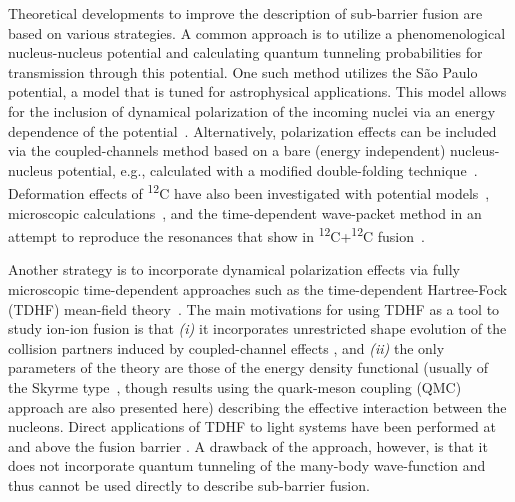 Theoretical developments to improve the description of sub-barrier fusion are based on various strategies.
A common approach is to utilize a phenomenological nucleus-nucleus potential and calculating quantum tunneling probabilities for transmission through this potential.
One such method utilizes the S\~ao Paulo potential, a model that is tuned for astrophysical applications. 
This model allows for the inclusion of dynamical polarization of the incoming nuclei via an energy dependence of the potential~\protect\cite{gasques2004,gasques2005,gasques2007}.
Alternatively, polarization effects can be included via the coupled-channels method based on a bare (energy independent) nucleus-nucleus potential, 
e.g., calculated with a modified double-folding technique~\protect\cite{esbensen2011,jiang2013}.
Deformation effects of \textsuperscript{12}C have also been investigated with potential models~\protect\cite{denisov2010c}, microscopic calculations~\protect\cite{heenen1981},
and the time-dependent wave-packet method in an attempt to reproduce the resonances that show in \textsuperscript{12}C+\textsuperscript{12}C fusion~\protect\cite{diaz-torres2018}.

Another strategy is to incorporate dynamical polarization effects via fully microscopic time-dependent approaches 
such as the time-dependent Hartree-Fock (TDHF) mean-field theory~\protect\cite{negele1982,simenel2012,simenel2018}. 
The main motivations for using TDHF as a tool to study ion-ion fusion is that 
{\it (i)} it incorporates unrestricted shape evolution of the collision partners induced by coupled-channel effects \protect\cite{simenel2013b}, and
{\it (ii)} the only parameters of the theory are those of the energy density functional (usually of the Skyrme type~\protect\cite{skyrme1956}, though results using the quark-meson coupling (QMC)~\protect\cite{guichon1988,guichon1996,stone2016} approach are also presented here) 
describing the effective interaction between the nucleons. 
Direct applications of TDHF to light systems have been performed at and above the fusion barrier \protect\cite{bonche1978,lebhertz2012,simenel2013a}. 
A drawback of the approach, however, is that it does not incorporate quantum tunneling of the many-body wave-function 
and thus cannot be used directly to describe sub-barrier fusion. 

